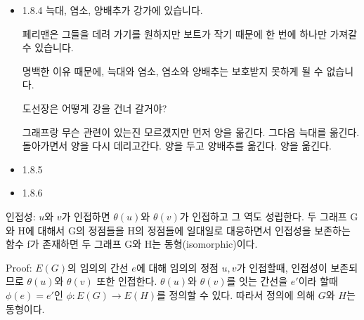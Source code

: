 \documentclass{oblivoir}
\begin{document}
\begin{itemize}
    \item 1.8.4
    늑대, 염소, 양배추가 강가에 있습니다.

페리맨은 그들을 데려 가기를 원하지만 보트가 작기 때문에 한 번에 하나만 가져갈 수 있습니다.

 명백한 이유 때문에, 늑대와 염소, 염소와 양배추는 보호받지 못하게 될 수 없습니다.
 
도선장은 어떻게 강을 건너 갈거야?

그래프랑 무슨 관련이 있는진 모르겠지만
먼저 양을 옮긴다. 그다음 늑대를 옮긴다. 돌아가면서 양을 다시 데리고간다. 양을 두고 양배추를 옮긴다. 양을 옮긴다.

    \item 1.8.5
    \item 1.8.6

\end{itemize}

인접성: $u$와 $v$가 인접하면 $\theta(u)$와  $\theta(v)$가 인접하고 그 역도 성립한다. 
두 그래프 G와 H에 대해서 G의 정점들을 H의 정점들에 일대일로 대응하면서 
인접성을 보존하는 함수 f가 존재하면 두 그래프 G와 H는 동형(isomorphic)이다.

Proof: $E(G)$의 임의의 간선 $e$에 대해 임의의 정점 $u,v$가 인접할때, 인접성이 보존되므로 $\theta(u)$와  $\theta(v)$ 또한 인접한다.
$\theta(u)$와  $\theta(v)$를 잇는 간선을 $e'$이라 할때 $\phi(e) = e'$인 $\phi: E(G) \longrightarrow E(H)$를 정의할 수 있다.
따라서 정의에 의해 $G$와 $H$는 동형이다.
\end{document}
